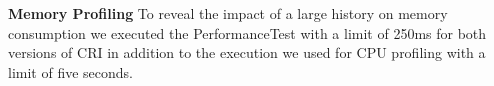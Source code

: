 	\textbf{Memory Profiling}
	To reveal the impact of a large history on memory consumption we executed the PerformanceTest with a limit of 250ms for both versions of CRI in addition to the execution we used for CPU profiling with a limit of five seconds.
	
	\begin{figure}[!h]
		\centering
		\hfill

\end{figure}
